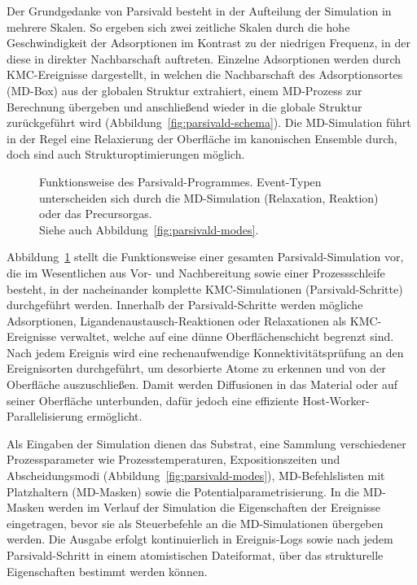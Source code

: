 Der Grundgedanke von Parsivald besteht in der Aufteilung der Simulation in mehrere Skalen.
So ergeben sich zwei zeitliche Skalen durch die hohe Geschwindigkeit der Adsorptionen im Kontrast zu der niedrigen Frequenz, in der diese in direkter Nachbarschaft auftreten.
Einzelne Adsorptionen werden durch KMC-Ereignisse dargestellt, in welchen die Nachbarschaft des Adsorptionsortes (MD-Box) aus der globalen Struktur extrahiert, einem MD-Prozess zur Berechnung übergeben und anschließend wieder in die globale Struktur zurückgeführt wird (Abbildung~\ref{fig:parsivald-schema}).
Die MD-Simulation führt in der Regel eine Relaxierung der Oberfläche im kanonischen Ensemble durch, doch sind auch Strukturoptimierungen möglich.

\begin{figure}
  \centering
  \def\svgwidth{\textwidth}
  
  \caption[Funktionsweise des Parsivald-Programmes]{
    Funktionsweise des Parsivald-Programmes.
    Event-Typen unterscheiden sich durch die MD-Simulation (Relaxation, Reaktion) oder das Precursorgas.\\
    Siehe auch Abbildung~\ref{fig:parsivald-modes}.
  }
  \label{fig:parsivald-stephierarchy}
\end{figure}

Abbildung~\ref{fig:parsivald-stephierarchy} stellt die Funktionsweise einer gesamten Parsivald-Simulation vor, die im Wesentlichen aus Vor- und Nachbereitung sowie einer Prozessschleife besteht, in der nacheinander komplette KMC-Simulationen (Parsivald-Schritte) durchgeführt werden.
Innerhalb der Parsivald-Schritte werden mögliche Adsorptionen, Ligandenaustausch-Reaktionen oder Relaxationen als KMC-Ereignisse verwaltet, welche auf eine dünne Oberflächenschicht begrenzt sind.
Nach jedem Ereignis wird eine rechenaufwendige Konnektivitätsprüfung an den Ereignisorten durchgeführt, um desorbierte Atome zu erkennen und von der Oberfläche auszuschließen.
Damit werden Diffusionen in das Material oder auf seiner Oberfläche unterbunden, dafür jedoch eine effiziente Host-Worker-Parallelisierung ermöglicht.

Als Eingaben der Simulation dienen das Substrat, eine Sammlung verschiedener Prozessparameter wie Prozesstemperaturen, Expositionszeiten und Abscheidungsmodi (Abbildung~\ref{fig:parsivald-modes}), MD-Befehlslisten mit Platzhaltern (MD-Masken) sowie die Potentialparametrisierung.
In die MD-Masken werden im Verlauf der Simulation die Eigenschaften der Ereignisse eingetragen, bevor sie als Steuerbefehle an die MD-Simulationen übergeben werden.
Die Ausgabe erfolgt kontinuierlich in Ereignis-Logs sowie nach jedem Parsivald-Schritt in einem atomistischen Dateiformat, über das strukturelle Eigenschaften bestimmt werden können.

